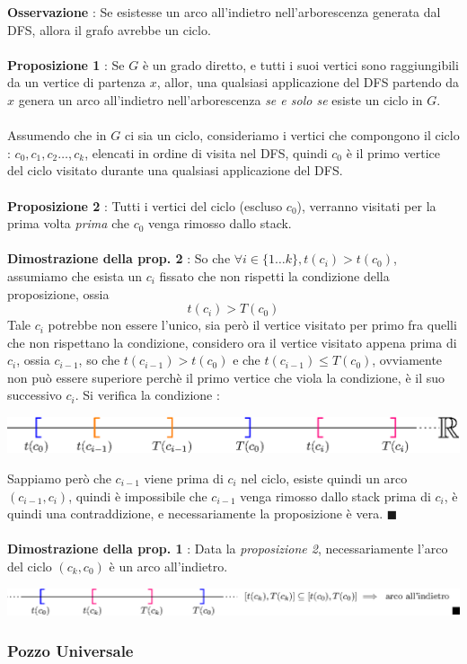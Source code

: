 \documentclass[12pt, letterpaper]{article}
\newcommand{\acc}{\\\hphantom{}\\}
\begin{document}
\textbf{Osservazione} : Se esistesse un arco all'indietro nell'arborescenza generata dal DFS, allora 
il grafo avrebbe un ciclo.\acc 
\textbf{Proposizione 1} : Se \(G\) è un grado diretto, e tutti i suoi vertici sono raggiungibili da un 
vertice di partenza \(x\), allor, una qualsiasi applicazione del DFS partendo da \(x\) genera un
 arco all'indietro nell'arborescenza \textit{se e solo se} esiste un ciclo in \(G\).\acc 
Assumendo che in \(G\) ci sia un ciclo, consideriamo i vertici che compongono il ciclo :
$c_0,c_1,c_2\dots,c_k$, elencati in ordine di visita nel DFS, quindi \(c_0\) è il primo vertice del ciclo 
visitato durante una qualsiasi applicazione del DFS.
 \acc\textbf{Proposizione 2} : Tutti i vertici del ciclo (escluso $c_0$), verranno visitati per la prima 
 volta \textit{prima} che \(c_0\) venga rimosso dallo stack.\acc 
 \textbf{Dimostrazione della prop. 2} : So che $\forall i\in\{1\dots k\},t(c_i)>t(c_0)$, assumiamo che 
 esista un \(c_i\) fissato che non rispetti la condizione della proposizione, ossia $$t(c_i)>T(c_0)$$
 Tale $c_i$ potrebbe non essere l'unico, sia però il vertice visitato per primo fra quelli che non rispettano 
 la condizione, considero ora il vertice visitato appena prima di $c_i$, ossia $c_{i-1}$, so che 
 $t(c_{i-1})>t(c_0)$ e che $t(c_{i-1})\le T(c_0)$, ovviamente non può essere superiore perchè il primo 
 vertice che viola la condizione, è il suo successivo $c_i$. Si verifica la condizione :
 \begin{center}
    \includegraphics[width=1\textwidth ]{images/realLine.eps}
\end{center}
Sappiamo però che $c_{i-1}$ viene prima di $c_i$ nel ciclo, esiste quindi un arco $(c_{i-1},c_i)$, quindi 
è impossibile che $c_{i-1}$ venga rimosso dallo stack prima di $c_i$, è quindi una contraddizione, e 
necessariamente la proposizione è vera. \(\blacksquare\)\acc 
\textbf{Dimostrazione della prop. 1} : Data la \textit{proposizione 2}, necessariamente l'arco del 
ciclo \((c_k,c_0)\) è un arco all'indietro. \begin{center}
    \includegraphics[width=1\textwidth ]{images/realLine2.eps}
\end{center}\subsubsection{Pozzo Universale}
\end{document}
